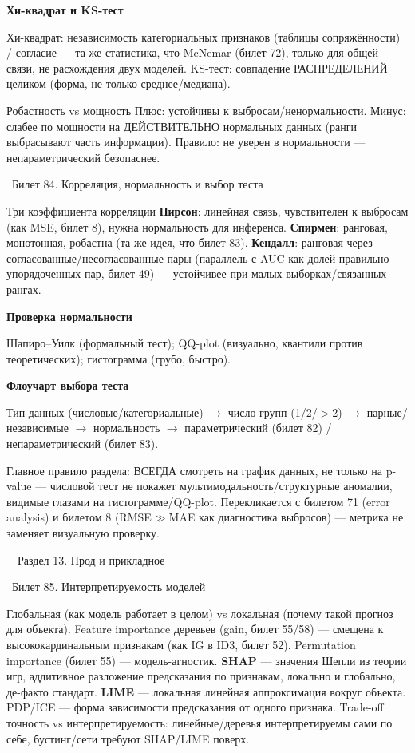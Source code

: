 \documentclass[12pt, a4paper]{article}
\newcommand{\razdel}[2]{%
  \clearpage%
  \noindent\colorbox{razdelcol}{\parbox{\dimexpr\linewidth-2\fboxsep\relax}{%
    \color{white}\LARGE\bfseries\strut\ \ Раздел #1. #2%
  }}%
  \vspace{10pt}%
}
\newcommand{\bilet}[2]{%
  \vspace{10pt}%
  \noindent\colorbox{qcolor}{\parbox{\dimexpr\linewidth-2\fboxsep\relax}{%
    \color{white}\large\bfseries\strut\ Билет #1. #2%
  }}%
  \nopagebreak\vspace{5pt}\par\nopagebreak%
}
\newcommand{\qsub}[1]{%
  \vspace{5pt}%
  {\bfseries\color{defblue} #1}%
  \par\vspace{2pt}%
}
\begin{document}
\qsub{Хи-квадрат и KS-тест}
Хи-квадрат: независимость категориальных признаков (таблицы сопряжённости) / согласие --- та же статистика, что McNemar (билет 72), только для общей связи, не расхождения двух моделей. KS-тест: совпадение РАСПРЕДЕЛЕНИЙ целиком (форма, не только среднее/медиана).

\begin{propbox}{Робастность vs мощность}
Плюс: устойчивы к выбросам/ненормальности. Минус: слабее по мощности на ДЕЙСТВИТЕЛЬНО нормальных данных (ранги выбрасывают часть информации). Правило: не уверен в нормальности --- непараметрический безопаснее.
\end{propbox}

\bilet{84}{Корреляция, нормальность и выбор теста}

\begin{defbox}{Три коэффициента корреляции}
\textbf{Пирсон}: линейная связь, чувствителен к выбросам (как MSE, билет 8), нужна нормальность для инференса. \textbf{Спирмен}: ранговая, монотонная, робастна (та же идея, что билет 83). \textbf{Кендалл}: ранговая через согласованные/несогласованные пары (параллель с AUC как долей правильно упорядоченных пар, билет 49) --- устойчивее при малых выборках/связанных рангах.
\end{defbox}

\qsub{Проверка нормальности}
Шапиро--Уилк (формальный тест); QQ-plot (визуально, квантили против теоретических); гистограмма (грубо, быстро).

\qsub{Флоучарт выбора теста}
Тип данных (числовые/категориальные) $\to$ число групп (1/2/$>$2) $\to$ парные/независимые $\to$ нормальность $\to$ параметрический (билет 82) / непараметрический (билет 83).

\begin{fishkabox}
Главное правило раздела: ВСЕГДА смотреть на график данных, не только на p-value --- числовой тест не покажет мультимодальность/структурные аномалии, видимые глазами на гистограмме/QQ-plot. Перекликается с билетом 71 (error analysis) и билетом 8 (RMSE$\gg$MAE как диагностика выбросов) --- метрика не заменяет визуальную проверку.
\end{fishkabox}

\vspace{1cm}
\razdel{13}{Прод и прикладное}

\bilet{85}{Интерпретируемость моделей}
Глобальная (как модель работает в целом) vs локальная (почему такой прогноз для объекта). Feature importance деревьев (gain, билет 55/58) --- смещена к высококардинальным признакам (как IG в ID3, билет 52). Permutation importance (билет 55) --- модель-агностик. \textbf{SHAP} --- значения Шепли из теории игр, аддитивное разложение предсказания по признакам, локально и глобально, де-факто стандарт. \textbf{LIME} --- локальная линейная аппроксимация вокруг объекта. PDP/ICE --- форма зависимости предсказания от одного признака. Trade-off точность vs интерпретируемость: линейные/деревья интерпретируемы сами по себе, бустинг/сети требуют SHAP/LIME поверх.
\end{document}
